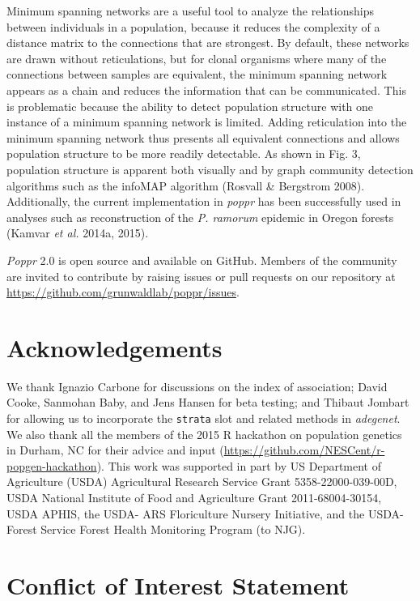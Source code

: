 \documentclass[double,12pt]{beavtex}
\begin{document}
  Minimum spanning networks are a useful tool to analyze the relationships
  between individuals in a population, because it reduces the complexity
  of a distance matrix to the connections that are strongest. By default,
  these networks are drawn without reticulations, but for clonal organisms
  where many of the connections between samples are equivalent, the
  minimum spanning network appears as a chain and reduces the information
  that can be communicated. This is problematic because the ability to
  detect population structure with one instance of a minimum spanning
  network is limited. Adding reticulation into the minimum spanning
  network thus presents all equivalent connections and allows population
  structure to be more readily detectable. As shown in Fig. 3, population
  structure is apparent both visually and by graph community detection
  algorithms such as the infoMAP algorithm (Rosvall \& Bergstrom 2008).
  Additionally, the current implementation in \emph{poppr} has been
  successfully used in analyses such as reconstruction of the \emph{P.
  ramorum} epidemic in Oregon forests (Kamvar \emph{et al.} 2014a, 2015).
  
  \emph{Poppr} 2.0 is open source and available on GitHub. Members of the
  community are invited to contribute by raising issues or pull requests
  on our repository at \url{https://github.com/grunwaldlab/poppr/issues}.
  
  \section{Acknowledgements}\label{acknowledgements}
  
  We thank Ignazio Carbone for discussions on the index of association;
  David Cooke, Sanmohan Baby, and Jens Hansen for beta testing; and
  Thibaut Jombart for allowing us to incorporate the \texttt{strata} slot
  and related methods in \emph{adegenet}. We also thank all the members of
  the 2015 R hackathon on population genetics in Durham, NC for their
  advice and input (\url{https://github.com/NESCent/r-popgen-hackathon}).
  This work was supported in part by US Department of Agriculture (USDA)
  Agricultural Research Service Grant 5358-22000-039-00D, USDA National
  Institute of Food and Agriculture Grant 2011-68004-30154, USDA APHIS,
  the USDA- ARS Floriculture Nursery Initiative, and the USDA-Forest
  Service Forest Health Monitoring Program (to NJG).
  
  \section{Conflict of Interest
  Statement}\label{conflict-of-interest-statement}
  
\end{document}
